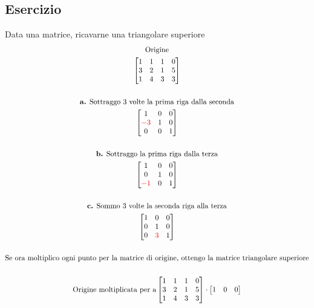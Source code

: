 \documentclass[italian]{article}
\begin{document}
\pagebreak
\subsection{Esercizio} 
Data una matrice, ricavarne una triangolare superiore
\begin{gather*}
	\text{Origine}\\
	\begin{bmatrix}
		1 & 1 & 1 & 0 \\
		3 & 2 & 1 & 5 \\
		1 & 4 & 3 & 3
	\end{bmatrix}
	\\\\
	\text{\textbf{a.} Sottraggo 3 volte la prima riga dalla seconda}\\
	\begin{bmatrix}
		1 & 0 & 0 \\
		\textcolor{red}{-3} & 1 & 0 \\
		0 & 0 & 1
	\end{bmatrix}
	\\\\
	\text{\textbf{b.} Sottraggo la prima riga dalla terza}\\
	\begin{bmatrix}
		1 & 0 & 0 \\
		0 & 1 & 0 \\
		\textcolor{red}{-1} & 0 & 1
	\end{bmatrix}
	\\\\
	\text{\textbf{c.} Sommo 3 volte la seconda riga alla terza}\\
	\begin{bmatrix}
		1 & 0 & 0 \\
		0 & 1 & 0 \\
		0 & \textcolor{red}{3} & 1
	\end{bmatrix}
	\\\\
	\text{Se ora moltiplico ogni punto per la matrice di origine, ottengo la matrice triangolare superiore}
	\\\\
	\text{Origine moltiplicata per a}
	\begin{bmatrix}
		1 & 1 & 1 & 0 \\
		3 & 2 & 1 & 5 \\
		1 & 4 & 3 & 3
	\end{bmatrix}
	\cdot
	\begin{bmatrix}
		1 & 0 & 0 \\

\end{bmatrix}
\end{gather*}
\end{document}
